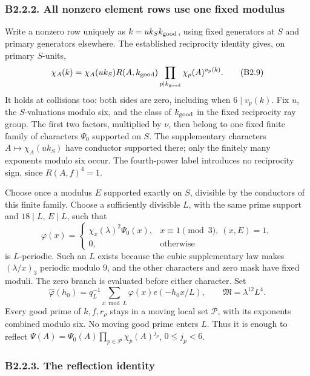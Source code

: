 \documentclass[11pt,a4paper]{article}
\begin{document}
\hypertarget{b2.2.2.-all-nonzero-element-rows-use-one-fixed-modulus}{%
\subsubsection{B2.2.2. All nonzero element rows use one fixed
modulus}\label{b2.2.2.-all-nonzero-element-rows-use-one-fixed-modulus}}

Write a nonzero row uniquely as \(k=u k_S k_{\rm good}\), using fixed
generators at \(S\) and primary generators elsewhere. The established
reciprocity identity gives, on primary \(S\)-units, \[
\chi_A(k)=\chi_A(uk_S)R(A,k_{\rm good})
          \prod_{p\mid k_{\rm good}}\chi_p(A)^{v_p(k)}.
\tag{B2.9}
\] It holds at collisions too: both sides are zero, including when
\(6\mid v_p(k)\). Fix \(u\), the \(S\)-valuations modulo six, and the
class of \(k_{\rm good}\) in the fixed reciprocity ray group. The first
two factors, multiplied by \(\nu\), then belong to one fixed finite
family of characters \(\Psi_0\) supported on \(S\). The supplementary
characters \(A\mapsto\chi_A(uk_S)\) have conductor supported there; only
the finitely many exponents modulo six occur. The fourth-power label
introduces no reciprocity sign, since \(R(A,\allowbreak{}f)^4=1\).

Choose once a modulus \(E\) supported exactly on \(S\), divisible by the
conductors of this finite family. Choose a sufficiently divisible \(L\),
with the same prime support and \(18\mid L\), \(E\mid L\), such that \[
\varphi(x)=
\begin{cases}
\chi_x(\lambda)^2\Psi_0(x),&x\equiv1\pmod3,\ (x,E)=1,\\
0,&\text{otherwise}
\end{cases}
\] is \(L\)-periodic. Such an \(L\) exists because the cubic
supplementary law makes \((\lambda/x)_3\) periodic modulo \(9\), and the
other characters and zero mask have fixed moduli. The zero branch is
evaluated before either character. Set \[
\widehat\varphi(h_0)=q_L^{-1}\sum_{x\bmod L}\varphi(x)e(-h_0x/L),
\qquad \mathfrak M=\lambda^{12}L^4.
\tag{B2.10}
\] Every good prime of \(k,\allowbreak{}f,\allowbreak{}r_\rho\) stays in a moving local set
\(\mathcal P\), with its exponents combined modulo six. No moving good
prime enters \(L\). Thus it is enough to reflect
\(\Psi(A)=\Psi_0(A)\prod_{p\in\mathcal P}\chi_p(A)^{j_p}\),
\(0\le j_p<6\).

\hypertarget{b2.2.3.-the-reflection-identity}{%
\subsubsection{B2.2.3. The reflection
identity}\label{b2.2.3.-the-reflection-identity}}
\end{document}
